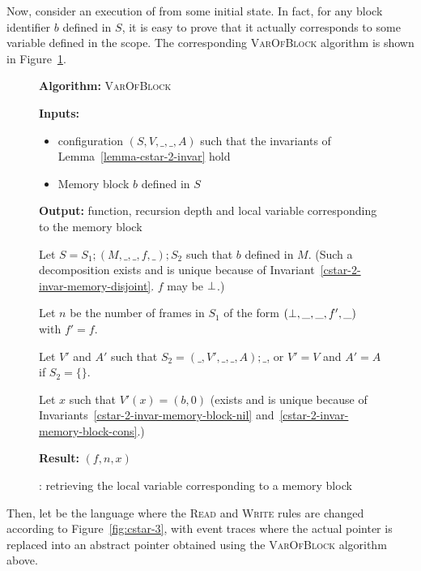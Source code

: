 Now, consider an execution of  from some initial state. In fact,
for any block identifier $b$ defined in $S$, it is easy to prove that
it actually corresponds to some variable defined in the scope. The
corresponding \textsc{VarOfBlock} algorithm is shown in
Figure~\ref{fig:cstar-2-block-to-variable}. 

\begin{figure}
  \textbf{Algorithm:} \textsc{VarOfBlock}
  
  \textbf{Inputs:}
  \begin{itemize}
    \item {} configuration $(S, V, \_, \_, A)$ such that the invariants
      of Lemma~\ref{lemma-cstar-2-invar} hold
    \item Memory block $b$ defined in $S$
  \end{itemize}
  \textbf{Output:} function, recursion depth and local variable
  corresponding to the memory block

  Let $S = S_1 ; (M, \_, \_, f, \_) ; S_2$ such that $b$ defined in
  $M$. (Such a decomposition exists and is unique because of
  Invariant~\ref{cstar-2-invar-memory-disjoint}. $f$ may be $\bot$.)

  Let $n$ be the number of frames in $S_1$ of the form $(\bot, \_,
  \_, f', \_)$ with $f' = f$.

  Let $V'$ and $A'$ such that $S_2 = (\_, V', \_, \_, A) ; \_$, or $V'
  = V$ and $A' = A$ if $S_2 = \{\}$.

  Let $x$ such that $V'(x) = (b, 0)$ (exists and is unique because of
  Invariants~\ref{cstar-2-invar-memory-block-nil}
  and~\ref{cstar-2-invar-memory-block-cons}.)

  \textbf{Result:} $(f, n, x)$
  
  \caption{: retrieving the local variable corresponding to a
    memory block}
  \label{fig:cstar-2-block-to-variable}
\end{figure}

Then, let  be the  language where the \textsc{Read} and
\textsc{Write} rules are changed according to
Figure~\ref{fig:cstar-3}, with event traces where the actual pointer
is replaced into an abstract pointer obtained using the
\textsc{VarOfBlock} algorithm above.


